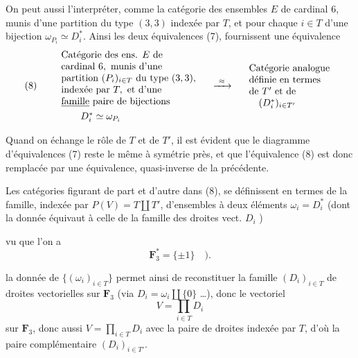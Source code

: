 \documentclass[11pt,a4paper]{article}
\begin{document}

On peut aussi l'interpréter,  comme la catégorie des
ensembles $E$ de cardinal $6$, munis d'une partition 
du type $(3,3)$ indexée par $T$, et pour chaque $i \in T$ d'une bijection
$\omega_{P_i} \simeq D_i^{*}$. Ainsi les deux équivalences (7), fournissent une
équivalence
\[
  (8) \qquad
  \begin{array}{l}
    \text{Catégorie des ens. } E \text{ de} \\
    \text{cardinal } 6, \text{ munis d'une} \\
    \text{partition } (P_i)_{i \in T} \text{ du type } (3,3), \\
    \text{indexée par } T, \text{ et d'une} \\
    \struck{\text{famille}}\ \text{paire de bijections} \\
    \qquad D_i^{*} \simeq \omega_{P_i}
  \end{array}
  \quad \xrightarrow{\ \approx\ } \quad
  \begin{array}{l}
    \text{Catégorie analogue} \\
    \text{définie en termes} \\
    \text{de } T' \text{ et de} \\
    \quad (D_i^{*})_{i \in T'}
  \end{array}
\]

Quand  on échange le rôle de $T$ et de $T'$, il
est évident que le diagramme d'équivalences (7) reste le même à symétrie près,
et que l'équivalence (8) est donc remplacée par  une équivalence,
 quasi-inverse de la précédente.

Les catégories figurant de part et d'autre dans (8), se définissent en termes
de la famille, indexée par $P(V) = T \amalg T'$, d'ensembles à deux éléments
$\omega_i = D_i^{*}$ (dont la donnée équivaut à celle de la famille des droites
vect. $D_i$ \ill{})


vu que  l'on a
\[
  \mathbf{F}_3^{*} = \{\pm 1\} \quad ).
\]

  la donnée de $\{(\omega_i)_{i \in T}\}$ permet
ainsi de reconstituer  la famille $(D_i)_{i \in T}$ de
droites vectorielles sur $\mathbf{F}_3$ (via $D_i = \omega_i \amalg \{0\}$
\ldots), donc le vectoriel
\[
  V = \prod_{i \in T} D_i
\]
sur $\mathbf{F}_3$, donc aussi 
$V = \prod_{i \in T} D_i$ avec la paire de droites indexée par $T$, d'où la
paire complémentaire $(D_i)_{i \in T'}$. 
\end{document}
